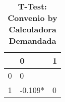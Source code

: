 \begin{table}[H]\centering \caption{\textbf{T-Test: Convenio by Calculadora Demandada}}
\begin{tabular}{l*{2}{l}}
\toprule
                     & 0            & 1\\\midrule
0             &      0                   \\
1             & -0.109*      &      0    \\
\bottomrule\end{tabular}
\end{table}
